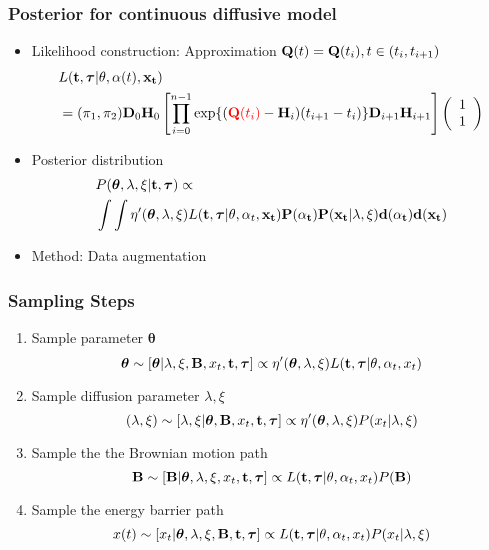 \documentclass[11pt]{beamer}
\newcommand{\bit}{\begin{itemize}\setlength{\itemsep}{0cm}\setlength{\topsep}{0cm}}
\newcommand{\eit}{\end{itemize}}
\newcommand{\benum}{\begin{enumerate}\setlength{\itemsep}{0cm}\setlength{\parsep
}{0cm}}
\newcommand{\eenum}{\end{enumerate}}
\newcommand{\bB}{{\bf B}}
\newcommand{\bx}{\bf{x}}
\newcommand{\bQ}{{\bf Q}}
\newcommand{\bH}{{\bf H}}
\newcommand{\bD}{{\bf D}}
\newcommand{\btheta}{{\boldsymbol{\theta}}}
\newcommand{\btau}{{\boldsymbol{\tau}}}
\newcommand{\bt}{{\bf t}}
\begin{document}
\begin{frame}
\frametitle{Posterior for continuous diffusive model}
\bit
\item Likelihood construction: Approximation $\bQ(t)=\bQ(t_i), t\in (t_i,t_{i+1})$
\begin{align*}
& L(\bt,\btau|\theta,\alpha(t),\bx_t)\\
&=(\pi_1,\pi_2)\bD_0\bH_0\left[\prod_{i=0}^{n-1}\exp\{({\color{red}\bQ(t_i)}-\bH_i)(t_{i+1}- t_i)\}\bD_{i+1}{\bH_{i+1}}\right]\left(\begin{array}{c}
1\\
1
\end{array}\right)
\end{align*}
\pause
\item Posterior distribution
\begin{align*}
& P(\btheta,\lambda,\xi|\bt,\btau)\propto\\ 
&\int\int \eta'(\btheta,\lambda,\xi)L(\bt,\btau|\theta,\alpha_t,\bx_t)P(\alpha_t)P(\bx_t|\lambda,\xi)d(\alpha_t)d(\bx_t)
\end{align*}
\item Method: Data augmentation 
\eit
\end{frame}

\begin{frame}
\frametitle{Sampling Steps}

\benum
\item Sample parameter $\btheta$
$$\btheta\sim[\btheta|\lambda,\xi,\bB,x_t,\bt,\btau]\propto \eta'(\btheta,\lambda,\xi)L(\bt,\btau|\theta,\alpha_t,x_t)$$

\item Sample diffusion parameter $\lambda,\xi$
$$(\lambda,\xi)\sim[\lambda,\xi|\btheta,\bB,x_t,\bt,\btau]\propto \eta'(\btheta,\lambda,\xi)P(x_t|\lambda,\xi)$$

\item Sample the the Brownian motion path
$$\bB\sim [\bB|\btheta,\lambda,\xi,x_t,\bt,\btau]\propto L(\bt,\btau|\theta,\alpha_t,x_t) P(\bB)$$

\item Sample the energy barrier path
$$x(t)\sim[x_t|\btheta,\lambda,\xi,\bB,\bt,\btau]\propto L(\bt,\btau|\theta,\alpha_t,x_t)P(x_t|\lambda,\xi)$$

\eenum
\end{frame}
\end{document}
